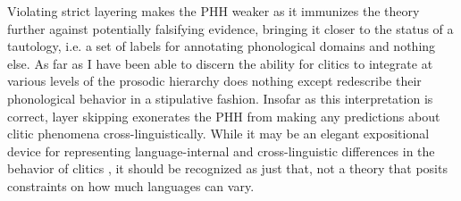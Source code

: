 \documentclass[output=paper,hidelinks]{langscibook}
\begin{document}
Violating strict layering makes the PHH weaker as it immunizes the theory further against potentially falsifying evidence, bringing it closer to the status of a tautology, i.e. a set of labels for annotating phonological domains and nothing else. As far as I have been able to discern the ability for clitics to integrate at various levels of the prosodic hierarchy does nothing except redescribe their phonological behavior in a stipulative fashion. Insofar as this interpretation is correct, layer skipping exonerates the PHH from making any predictions about clitic phenomena cross-linguistically. While it may be an elegant expositional device for representing language-internal and cross-linguistic differences in the behavior of clitics \citep{peperkamp1996prosodic}, it should be recognized as just that, not a theory that posits constraints on how much languages can vary. 






\end{document}
